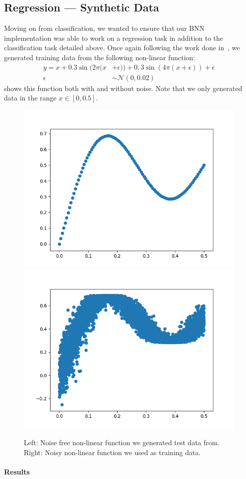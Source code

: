 \documentclass[11pt]{article}
\begin{document}
\subsection{Regression --- Synthetic Data}
Moving on from classification, we wanted to ensure that our BNN implementation 
was able to work on a regression task in addition to the classification task
detailed above. Once again following the work done in~\cite{blundell}, we 
generated training data from the following non-linear function:
\begin{align*}
  y = x + 0.3 \sin(2\pi (x &+ \epsilon)) + 0,3 \sin(4\pi (x + \epsilon)) + \epsilon \\
  \epsilon &\sim \mathcal{N}(0, 0.02)
\end{align*}
 shows this function both with and without noise.
Note that we only generated data in the range $x\in [0, 0.5]$.

\begin{figure}[H]
  \centering\includegraphics[width=.45\textwidth]{figures/regression_curve.png}
  \centering\includegraphics[width=.45\textwidth]{figures/regression_curve_with_noise.png}
  \caption{Left: Noise free non-linear function we generated test data from.
  Right: Noisy non-linear function we used as training data.}
  \label{fig:reg_syth_data}
\end{figure}

\paragraph{Results} 
\end{document}
